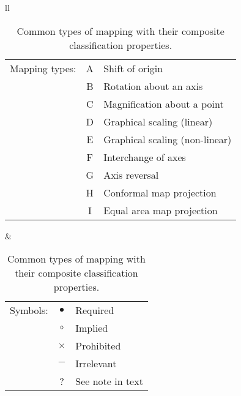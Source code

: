 \documentclass[twoside,nolof,11pt]{starlink}
\providecommand{\req}[0]{$\bullet$}
\providecommand{\imp}[0]{$\circ$}
\providecommand{\pro}[0]{$\times$}
\providecommand{\irr}[0]{$-$}
\begin{document}
\begin{table}
\begin{center}
\begin{footnotesize}
\begin{tabular}{ll}
\begin{tabular}[t]{rc@{ -- }l}
Mapping types: & A & Shift of origin \\
               & B & Rotation about an axis \\
               & C & Magnification about a point \\
               & D & Graphical scaling (linear) \\
               & E &  Graphical scaling (non-linear) \\
               & F & Interchange of axes \\
               & G & Axis reversal \\
               & H & Conformal map projection \\
               & I & Equal area map projection \\
\end{tabular}&
\begin{tabular}[t]{rc@{ -- }l}
Symbols: & \req & Required \\
         & \imp & Implied \\
         & \pro & Prohibited \\
         & \irr & Irrelevant \\
         & ?    & See note in text \\
\end{tabular}
\end{tabular}
\end{footnotesize}
\end{center}

\caption{Common types of mapping with their composite classification
properties.}

\label{table:composite}

\end{table}
\end{document}
